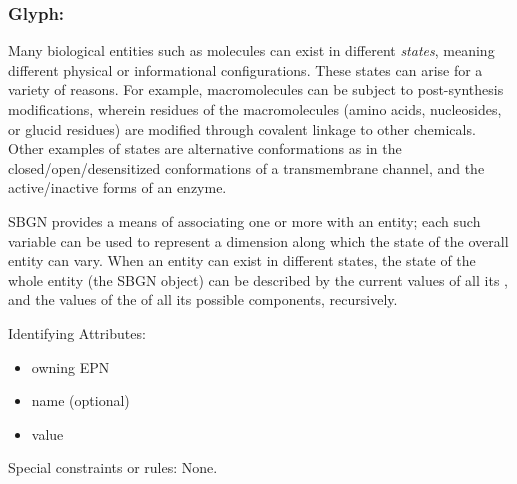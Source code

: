 \subsubsection{Glyph: }
\label{sec:stateVariable}

Many biological entities such as molecules can exist in different \emph{states}, meaning different physical or informational configurations.  These states can arise for a variety of reasons.  For example, macromolecules can be subject to post-synthesis modifications, wherein residues of the macromolecules (amino acids, nucleosides, or glucid residues) are modified through covalent linkage to other chemicals.  Other examples of states are alternative conformations as in the closed/open/desensitized conformations of a transmembrane channel, and the active/inactive forms of an enzyme.

SBGN provides a means of associating one or more  with an entity; each such variable can be used to represent a dimension along which the state of the overall entity can vary.  When an entity can exist in different states, the state of the whole entity (\ie the SBGN object) can be described by the current values of all its , and the values of the  of all its possible components, recursively.

\begin{glyphDescription}
\item[Identifying Attributes:]\mbox{}
  \begin{itemize}
  \item owning EPN
  \item name (optional)
  \item value
 \end{itemize}
\item[Special constraints or rules:]\mbox{}\newline None.
\end{glyphDescription}

